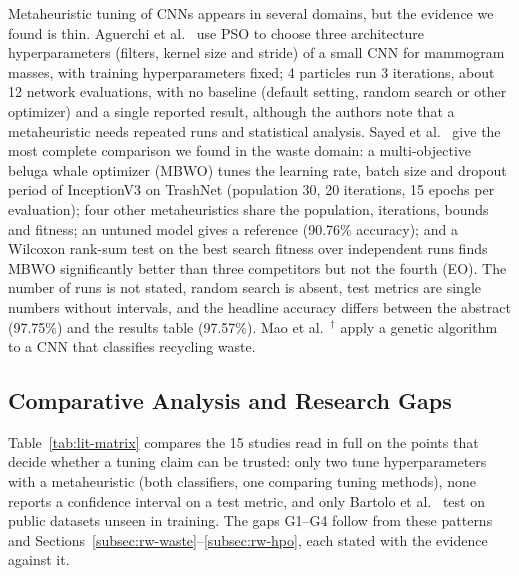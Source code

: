 Metaheuristic tuning of CNNs appears in several domains, but the evidence we found is thin. Aguerchi et al.~\cite{aguerchi2024cnn} use PSO to choose three architecture hyperparameters (filters, kernel size and stride) of a small CNN for mammogram masses, with training hyperparameters fixed; 4 particles run 3 iterations, about 12 network evaluations, with no baseline (default setting, random search or other optimizer) and a single reported result, although the authors note that a metaheuristic needs repeated runs and statistical analysis. Sayed et al.~\cite{sayed2024intelligent} give the most complete comparison we found in the waste domain: a multi-objective beluga whale optimizer (MBWO) tunes the learning rate, batch size and dropout period of InceptionV3 on TrashNet (population 30, 20 iterations, 15 epochs per evaluation); four other metaheuristics share the population, iterations, bounds and fitness; an untuned model gives a reference (90.76\% accuracy); and a Wilcoxon rank-sum test on the best search fitness over independent runs finds MBWO significantly better than three competitors but not the fourth (EO). The number of runs is not stated, random search is absent, test metrics are single numbers without intervals, and the headline accuracy differs between the abstract (97.75\%) and the results table (97.57\%). Mao et al.~\cite{mao2021recycling}$^{\dagger}$ apply a genetic algorithm to a CNN that classifies recycling waste.

\subsection{Comparative Analysis and Research Gaps}
\label{subsec:gaps}

Table~\ref{tab:lit-matrix} compares the 15 studies read in full on the points that decide whether a tuning claim can be trusted: only two tune hyperparameters with a metaheuristic (both classifiers, one comparing tuning methods), none reports a confidence interval on a test metric, and only Bartolo et al.~\cite{bartolo2025learning} test on public datasets unseen in training. The gaps G1--G4 follow from these patterns and Sections~\ref{subsec:rw-waste}--\ref{subsec:rw-hpo}, each stated with the evidence against it.

